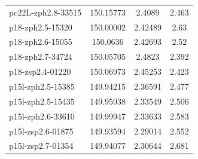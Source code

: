\documentclass[twocolumn,tight,times]{aastex63}
\begin{document}
\begin{center}
\begin{longtable}{l|c|c|c}
pc22L-zph2.8-33515 & 150.15773 & 2.4089 & 2.463 \\
p18-zph2.5-15320 & 150.00002 & 2.42489 & 2.63 \\
p18-zph2.6-15055 & 150.0636 & 2.42693 & 2.52 \\
p18-zph2.7-34724 & 150.05705 & 2.4823 & 2.392 \\
p18-zsp2.4-01220 & 150.06973 & 2.45253 & 2.423 \\
p15l-zph2.5-15385 & 149.94215 & 2.36591 & 2.477 \\
p15l-zph2.5-15435 & 149.95938 & 2.33549 & 2.506 \\
p15l-zph2.6-33610 & 149.99947 & 2.33633 & 2.583 \\
p15l-zsp2.6-01875 & 149.93594 & 2.29014 & 2.552 \\
p15l-zsp2.7-01354 & 149.94077 & 2.30644 & 2.681 \\
\end{longtable}
\end{center}
\end{document}
